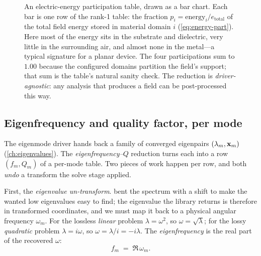 \begin{figure}[t]
\centering
{}
\caption[Energy participation per domain]{An electric-energy participation table,
drawn as a bar chart. Each bar is one row of the rank-1 table: the fraction
$p_i=\mathrm{energy}_i/e_{\text{total}}$ of the total field energy stored in
material domain $i$ (\cref{eq:energy-part}). Here most of the energy sits in the
substrate and dielectric, very little in the surrounding air, and almost none in
the metal---a typical signature for a planar device. The four participations sum
to $1.00$ because the configured domains partition the field's support; that sum
is the table's natural sanity check. The reduction is \emph{driver-agnostic}: any
analysis that produces a field can be post-processed this way.}
\label{fig:energy-bars}
\end{figure}

\subsection{Eigenfrequency and quality factor, per mode}
\label{sec:fq-table}

The eigenmode driver hands back a family of converged eigenpairs
$(\lambda_m,\mathbf{x}_m)$ (\cref{ch:eigenvalues}). The \emph{eigenfrequency--$Q$}
reduction turns each into a row $(f_m,Q_m)$ of a per-mode table. Two pieces of
work happen per row, and both \emph{undo} a transform the solve stage applied.

First, the \emph{eigenvalue un-transform}.  bent the
spectrum with a shift to make the wanted low eigenvalues easy to find; the
eigenvalue the library returns is therefore in transformed coordinates, and we
must map it back to a physical angular frequency $\omega_m$. For the lossless
\emph{linear} problem $\lambda=\omega^2$, so $\omega=\sqrt\lambda$; for the lossy
\emph{quadratic} problem $\lambda=i\omega$, so $\omega=\lambda/i=-i\lambda$. The
\emph{eigenfrequency} is the real part of the recovered $\omega$:
\begin{equation}
  f_m \;=\; \Re\,\omega_m .
  \label{eq:eigfreq}
\end{equation}

